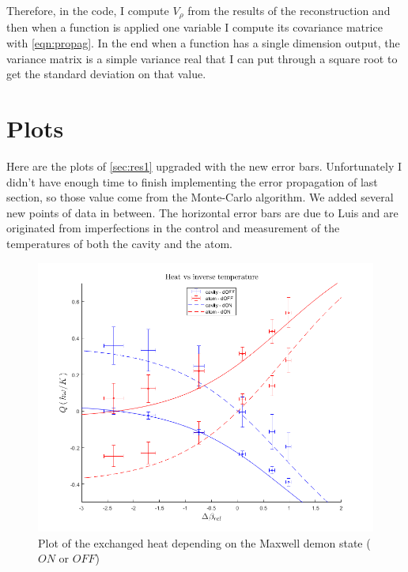 \documentclass[10pt,a4paper]{report}
\theoremstyle{plain}
\theoremstyle{definition}
\theoremstyle{remark}
\begin{document}
Therefore, in the code, I compute $V_\rho$ from the results of the
reconstruction and then when a function is applied one variable I compute its
covariance matrice with \cref{eqn:propag}. In the end when a function has a
single dimension output, the variance matrix is a simple variance real that I can put
through a square root to get the standard deviation on that value.

\section{Plots}

Here are the plots of \cref{sec:res1} upgraded with the new error bars.
Unfortunately I didn't have enough time to finish implementing the error
propagation of last section, so those value come from the Monte-Carlo algorithm.
We added several new points of data in between. The horizontal error bars are
due to Luis and are originated from imperfections in the control and measurement of the
temperatures of both the cavity and the atom.



\begin{figure}
  \centering
  \includegraphics[height=0.45\textheight]{plots/Heat2.png}
  \caption{Plot of the exchanged heat depending on the Maxwell demon state ($ON$
    or $OFF$)}\label{fig:heat2}
\end{figure}
\end{document}
